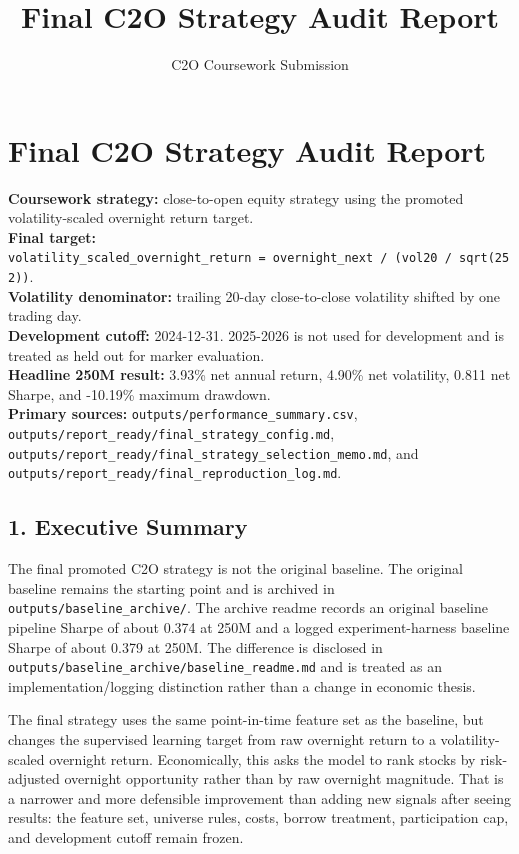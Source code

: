 \documentclass[
]{article}
\title{Final C2O Strategy Audit Report}
\author{C2O Coursework Submission}
\date{}
\begin{document}
\maketitle

\hypertarget{final-c2o-strategy-audit-report}{%
\section{Final C2O Strategy Audit
Report}\label{final-c2o-strategy-audit-report}}

\textbf{Coursework strategy:} close-to-open equity strategy using the
promoted volatility-scaled overnight return target.\\
\textbf{Final target:}
\texttt{volatility\_scaled\_overnight\_return\ =\ overnight\_next\ /\ (vol20\ /\ sqrt(252))}.\\
\textbf{Volatility denominator:} trailing 20-day close-to-close
volatility shifted by one trading day.\\
\textbf{Development cutoff:} 2024-12-31. 2025-2026 is not used for
development and is treated as held out for marker evaluation.\\
\textbf{Headline 250M result:} 3.93\% net annual return, 4.90\% net
volatility, 0.811 net Sharpe, and -10.19\% maximum drawdown.\\
\textbf{Primary sources:} \texttt{outputs/performance\_summary.csv},
\texttt{outputs/report\_ready/final\_strategy\_config.md},
\texttt{outputs/report\_ready/final\_strategy\_selection\_memo.md}, and
\texttt{outputs/report\_ready/final\_reproduction\_log.md}.

\hypertarget{1-executive-summary}{%
\subsection{1. Executive Summary}\label{1-executive-summary}}

The final promoted C2O strategy is not the original baseline. The
original baseline remains the starting point and is archived in
\texttt{outputs/baseline\_archive/}. The archive readme records an
original baseline pipeline Sharpe of about 0.374 at 250M and a logged
experiment-harness baseline Sharpe of about 0.379 at 250M. The
difference is disclosed in
\texttt{outputs/baseline\_archive/baseline\_readme.md} and is treated as
an implementation/logging distinction rather than a change in economic
thesis.

The final strategy uses the same point-in-time feature set as the
baseline, but changes the supervised learning target from raw overnight
return to a volatility-scaled overnight return. Economically, this asks
the model to rank stocks by risk-adjusted overnight opportunity rather
than by raw overnight magnitude. That is a narrower and more defensible
improvement than adding new signals after seeing results: the feature
set, universe rules, costs, borrow treatment, participation cap, and
development cutoff remain frozen.
\end{document}
